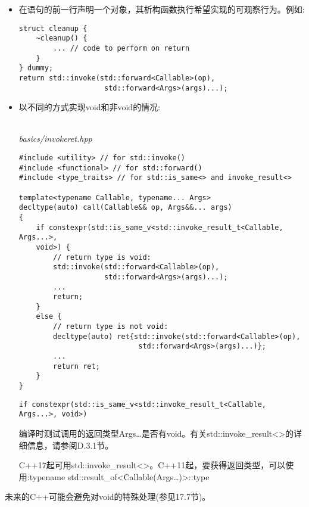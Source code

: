 \begin{itemize}
\item
在语句的前一行声明一个对象，其析构函数执行希望实现的可观察行为。例如:

\begin{lstlisting}[style=styleCXX]
struct cleanup {
	~cleanup() {
		... // code to perform on return
	}
} dummy;
return std::invoke(std::forward<Callable>(op),
					std::forward<Args>(args)...);
\end{lstlisting}

\item
以不同的方式实现void和非void的情况:

\hspace*{\fill} \\ %
\noindent
\textit{basics/invokeret.hpp}
\begin{lstlisting}[style=styleCXX]
#include <utility> // for std::invoke()
#include <functional> // for std::forward()
#include <type_traits> // for std::is_same<> and invoke_result<>

template<typename Callable, typename... Args>
decltype(auto) call(Callable&& op, Args&&... args)
{
	if constexpr(std::is_same_v<std::invoke_result_t<Callable, Args...>,
	void>) {
		// return type is void:
		std::invoke(std::forward<Callable>(op),
					std::forward<Args>(args)...);
		...
		return;
	}
	else {
		// return type is not void:
		decltype(auto) ret{std::invoke(std::forward<Callable>(op),
							std::forward<Args>(args)...)};
		...
		return ret;
	}
}
\end{lstlisting}

\begin{lstlisting}[style=styleCXX]
if constexpr(std::is_same_v<std::invoke_result_t<Callable, Args...>, void>)
\end{lstlisting}

编译时测试调用的返回类型Args…是否有void。有关std::invoke\_result<>的详细信息，请参阅D.3.1节。

\begin{tcolorbox}[colback=webgreen!5!white,colframe=webgreen!75!black]
\hspace*{0.75cm}C++17起可用std::invoke\_result<>。C++11起，要获得返回类型，可以使用:typename std::result\_of<Callable(Args…)>::type
\end{tcolorbox}

\end{itemize}

未来的C++可能会避免对void的特殊处理(参见17.7节)。












